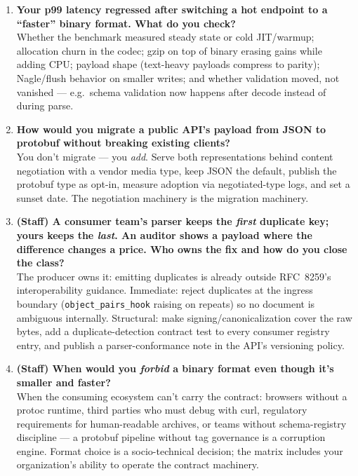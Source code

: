 \begin{enumerate}[label=\textbf{Q\arabic*.}, leftmargin=1.3cm, itemsep=0.8em]
\item \textbf{Your p99 latency regressed after switching a hot endpoint to a
``faster'' binary format. What do you check?}\\
Whether the benchmark measured steady state or cold JIT/warmup; allocation churn
in the codec; gzip on top of binary erasing gains while adding CPU; payload shape
(text-heavy payloads compress to parity); Nagle/flush behavior on smaller writes;
and whether validation moved, not vanished --- e.g.\ schema validation now happens
after decode instead of during parse.

\item \textbf{How would you migrate a public API's payload from JSON to protobuf
without breaking existing clients?}\\
You don't migrate --- you \emph{add}. Serve both representations behind content
negotiation with a vendor media type, keep JSON the default, publish the protobuf
type as opt-in, measure adoption via negotiated-type logs, and set a sunset date.
The negotiation machinery is the migration machinery.

\item \textbf{(Staff) A consumer team's parser keeps the \emph{first} duplicate
key; yours keeps the \emph{last}. An auditor shows a payload where the difference
changes a price. Who owns the fix and how do you close the class?}\\
The producer owns it: emitting duplicates is already outside RFC~8259's
interoperability guidance. Immediate: reject duplicates at the ingress boundary
(\texttt{object\_pairs\_hook} raising on repeats) so no document is ambiguous
internally. Structural: make signing/canonicalization cover the raw bytes, add a
duplicate-detection contract test to every consumer registry entry, and publish a
parser-conformance note in the API's versioning policy.

\item \textbf{(Staff) When would you \emph{forbid} a binary format even though
it's smaller and faster?}\\
When the consuming ecosystem can't carry the contract: browsers without a
protoc runtime, third parties who must debug with curl, regulatory requirements
for human-readable archives, or teams without schema-registry discipline --- a
protobuf pipeline without tag governance is a corruption engine. Format choice is
a socio-technical decision; the matrix includes your organization's ability to
operate the contract machinery.

\end{enumerate}

